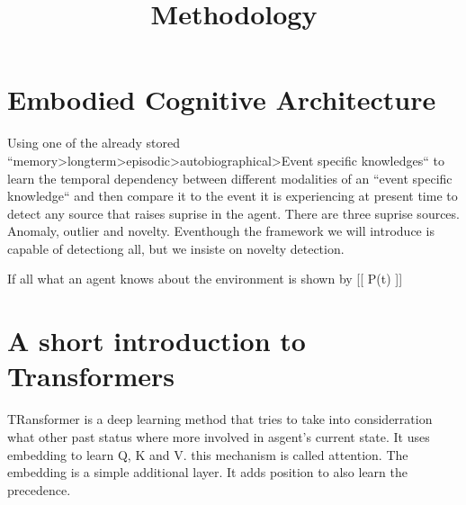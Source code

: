 \documentclass[a4paper]{article}
\title{Methodology}
\date{}
\begin{document}
    \maketitle
    
    
    
    \section{Embodied Cognitive Architecture}
    
    Using one of the already stored ``memory>longterm>episodic>autobiographical>Event specific knowledges`` to learn the temporal dependency between different modalities of an ``event specific knowledge`` and then compare it to the event it is experiencing at present time to detect any source that raises suprise in the agent. There are three suprise sources.
    Anomaly, outlier and novelty. Eventhough the framework we will introduce is capable of detectiong all, but we insiste on novelty detection.
    
    If all what an agent knows about the environment is shown by
    [[
        P(t)
    ]]
    
    \section{A short introduction to Transformers}
    TRansformer is a deep learning method that tries to take into considerration what other past status where more involved in asgent's current state. It uses embedding to learn Q, K and V.
    this mechanism is called attention.
    The embedding is a simple additional layer. It adds position to also learn the precedence.
\end{document}
